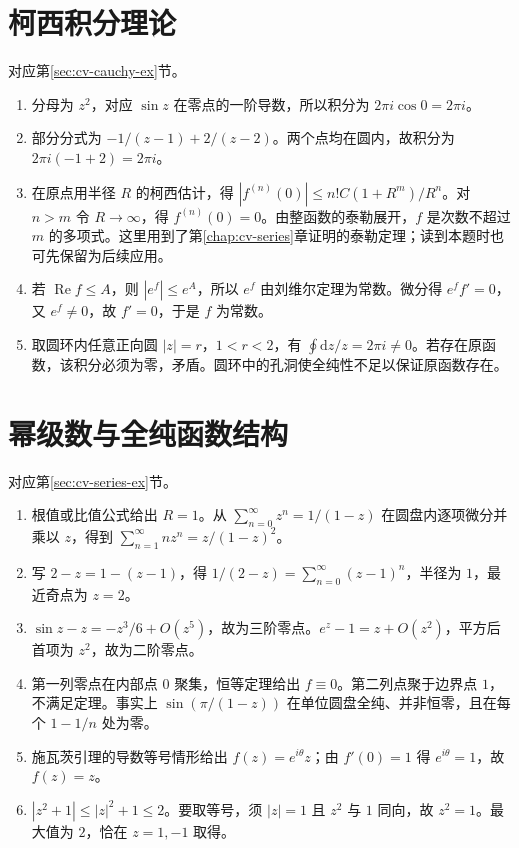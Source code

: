 \documentclass[UTF8,12pt,a4paper,fontset=fandol]{ctexbook}
\begin{document}
\section{柯西积分理论}
对应第\ref{sec:cv-cauchy-ex}节。
\begin{enumerate}
 \item 分母为 $z^2$，对应 $\sin z$ 在零点的一阶导数，所以积分为 $2\pi i\cos0=2\pi i$。
 \item 部分分式为 $-1/(z-1)+2/(z-2)$。两个点均在圆内，故积分为 $2\pi i(-1+2)=2\pi i$。
 \item 在原点用半径 $R$ 的柯西估计，得 $|f^{(n)}(0)|\le n!C(1+R^m)/R^n$。对 $n>m$ 令 $R\to\infty$，得 $f^{(n)}(0)=0$。由整函数的泰勒展开，$f$ 是次数不超过 $m$ 的多项式。这里用到了第\ref{chap:cv-series}章证明的泰勒定理；读到本题时也可先保留为后续应用。
 \item 若 $\operatorname{Re}f\le A$，则 $|e^f|\le e^A$，所以 $e^f$ 由刘维尔定理为常数。微分得 $e^ff'=0$，又 $e^f\ne0$，故 $f'=0$，于是 $f$ 为常数。
 \item 取圆环内任意正向圆 $|z|=r$，$1<r<2$，有 $\oint\mathrm dz/z=2\pi i\ne0$。若存在原函数，该积分必须为零，矛盾。圆环中的孔洞使全纯性不足以保证原函数存在。
\end{enumerate}

\section{幂级数与全纯函数结构}
对应第\ref{sec:cv-series-ex}节。
\begin{enumerate}
 \item 根值或比值公式给出 $R=1$。从 $\sum_{n=0}^\infty z^n=1/(1-z)$ 在圆盘内逐项微分并乘以 $z$，得到 $\sum_{n=1}^\infty nz^n=z/(1-z)^2$。
 \item 写 $2-z=1-(z-1)$，得 $1/(2-z)=\sum_{n=0}^\infty(z-1)^n$，半径为 $1$，最近奇点为 $z=2$。
 \item $\sin z-z=-z^3/6+O(z^5)$，故为三阶零点。$e^z-1=z+O(z^2)$，平方后首项为 $z^2$，故为二阶零点。
 \item 第一列零点在内部点 $0$ 聚集，恒等定理给出 $f\equiv0$。第二列点聚于边界点 $1$，不满足定理。事实上 $\sin(\pi/(1-z))$ 在单位圆盘全纯、并非恒零，且在每个 $1-1/n$ 处为零。
 \item 施瓦茨引理的导数等号情形给出 $f(z)=e^{i\theta}z$；由 $f'(0)=1$ 得 $e^{i\theta}=1$，故 $f(z)=z$。
 \item $|z^2+1|\le|z|^2+1\le2$。要取等号，须 $|z|=1$ 且 $z^2$ 与 $1$ 同向，故 $z^2=1$。最大值为 $2$，恰在 $z=1,-1$ 取得。
\end{enumerate}
\end{document}
